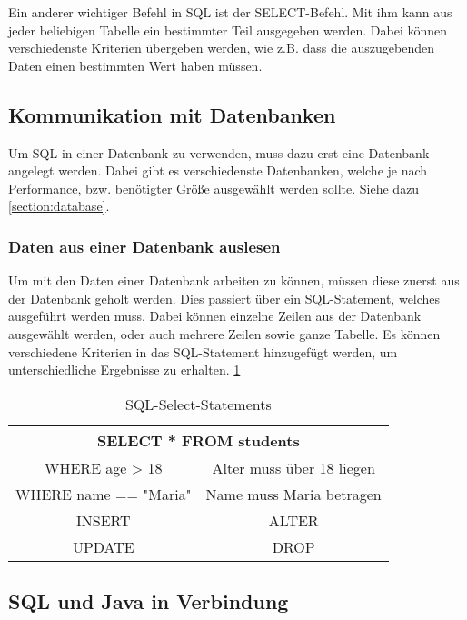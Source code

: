 Ein anderer wichtiger Befehl in SQL ist der SELECT-Befehl. Mit ihm kann aus jeder beliebigen Tabelle ein bestimmter Teil ausgegeben werden. Dabei können verschiedenste Kriterien übergeben werden, wie z.B. dass die auszugebenden Daten einen bestimmten Wert haben müssen. \cite{grundlagenSQL}
 
 
\subsection{Kommunikation mit Datenbanken}
Um SQL in einer Datenbank zu verwenden, muss dazu erst eine Datenbank angelegt werden. Dabei gibt es verschiedenste Datenbanken, welche je nach Performance, bzw. benötigter Größe ausgewählt werden sollte. Siehe dazu \ref{section:database}.
 
\subsubsection{Daten aus einer Datenbank auslesen}
Um mit den Daten einer Datenbank arbeiten zu können, müssen diese zuerst aus der Datenbank geholt werden. Dies passiert über ein SQL-Statement, welches ausgeführt werden muss. Dabei können einzelne Zeilen aus der Datenbank ausgewählt werden, oder auch mehrere Zeilen sowie ganze Tabelle. Es können verschiedene Kriterien in das SQL-Statement hinzugefügt werden, um unterschiedliche Ergebnisse zu erhalten. \cite{einfuerhungSQLBuch} \ref{tab:allgemein:selects}

\begin{table}
    \centering
    \begin{tabular}{ |c|c| }
     \hline
     \multicolumn{2}{|c|}{SELECT * FROM students } \\
     \hline
     \hline
     WHERE age > 18 & Alter muss über 18 liegen \\
     \hline
     \hline
     WHERE name == "Maria" & Name muss Maria betragen  \\
     \hline
     INSERT & ALTER \\
     \hline
     UPDATE & DROP  \\
     \hline
    \end{tabular}
    \caption{SQL-Select-Statements \cite{einfuerhungSQLBuch}}
    \label{tab:allgemein:selects}
\end{table}

    


\subsection{SQL und Java in Verbindung}

